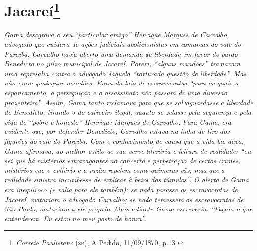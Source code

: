 {\chapter{Jacareí\footnote{\emph{Correio Paulistano} (\textsc{sp}), A Pedido, 11/09/1870,
  p.~3.}} %

\begin{didascalia}
\emph{Gama desagrava o seu ``particular amigo'' Henrique Marques de
Carvalho, advogado que cuidava de ações judiciais abolicionistas em
comarcas do vale do Paraíba. Carvalho havia aberto uma demanda de
liberdade em favor do pardo Benedicto no juízo municipal de Jacareí.
Porém, ``alguns mandões'' tramavam uma represália contra o advogado
daquela ``torturada questão de liberdade''. Mas não eram quaisquer
mandões. Eram da laia de escravocratas ``para os quais o espancamento, a
perseguição e o assassinato não passam de uma diversão prazenteira''.
Assim, Gama tanto reclamava para que se salvaguardasse a liberdade de
Benedicto, tirando-o do cativeiro ilegal, quanto se zelasse pela
segurança e pela vida do ``pobre e honesto'' Henrique Marques de Carvalho.
Para Gama, era evidente que, por defender Benedicto, Carvalho estava na
linha de tiro dos figurões do vale do Paraíba. Com o conhecimento de
causa que a vida lhe dava, Gama afirmava, ao melhor estilo de sua verve
literária e leitura de realidade: ``eu sei que há mistérios extravagantes
no concerto e perpetração de certos crimes, mistérios que o critério e a
razão repelem como quimeras vãs, mas que a realidade sinistra incumbe-se
de explicar à beira dos túmulos''. O alerta de Gama era inequívoco (e
valia para ele também): se nada parasse os escravocratas de Jacareí,
matariam o advogado Carvalho; se nada temessem os escravocratas de São
Paulo, matariam a ele próprio. Mais adiante Gama escreveria: ``Façam o
que entenderem. Eu estou no meu posto de honra''.}
\end{didascalia}


}
